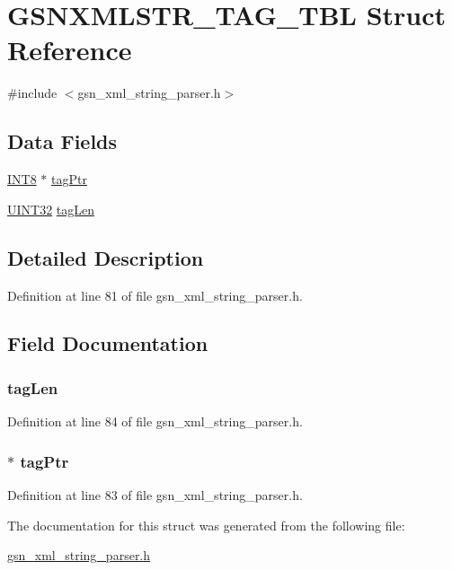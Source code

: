 \hypertarget{a00445}{
\section{GSNXMLSTR\_\-TAG\_\-TBL Struct Reference}
\label{a00445}
}


{\ttfamily \#include $<$gsn\_\-xml\_\-string\_\-parser.h$>$}

\subsection*{Data Fields}
\begin{DoxyCompactItemize}
\item 
\hyperlink{a00660_ga307b8734c020247f6bac4fcde0dcfbb9}{INT8} $\ast$ \hyperlink{a00445_a69fe522671e7e7b6468a2e5549e33eb8}{tagPtr}
\item 
\hyperlink{a00660_gae1e6edbbc26d6fbc71a90190d0266018}{UINT32} \hyperlink{a00445_a6ef02d18ce527c9522753f065487fcd5}{tagLen}
\end{DoxyCompactItemize}


\subsection{Detailed Description}


Definition at line 81 of file gsn\_\-xml\_\-string\_\-parser.h.



\subsection{Field Documentation}
\hypertarget{a00445_a6ef02d18ce527c9522753f065487fcd5}{
\subsubsection[{tagLen}]{ {\bf tagLen}}}
\label{a00445_a6ef02d18ce527c9522753f065487fcd5}


Definition at line 84 of file gsn\_\-xml\_\-string\_\-parser.h.

\hypertarget{a00445_a69fe522671e7e7b6468a2e5549e33eb8}{
\subsubsection[{tagPtr}]{$\ast$ {\bf tagPtr}}}
\label{a00445_a69fe522671e7e7b6468a2e5549e33eb8}


Definition at line 83 of file gsn\_\-xml\_\-string\_\-parser.h.



The documentation for this struct was generated from the following file:\begin{DoxyCompactItemize}
\item 
\hyperlink{a00617}{gsn\_\-xml\_\-string\_\-parser.h}\end{DoxyCompactItemize}
